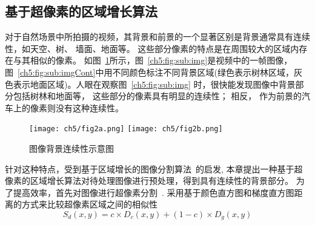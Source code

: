 \subsection{基于超像素的区域增长算法}
对于自然场景中所拍摄的视频，其背景和前景的一个显著区别是背景通常具有连续性，如天空、树、 墙面、地面等。 这些部分像素的特点是在周围较大的区域内存在与其相似的像素。
 如图~\ref{ch5:fig:cont}所示，图~\ref{ch5:fig:sub:img}是视频中的一帧图像， 图~\ref{ch5:fig:sub:imgCont}中用不同颜色标注不同背景区域(绿色表示树林区域，灰色表示地面区域)。人眼在观察图~\ref{ch5:fig:sub:img} 时，很快能发现图像中背景部分包括树林和地面等， 这些部分的像素具有明显的连续性； 相反， 作为前景的汽车上的像素则没有这种连续性。\par

 \begin{figure}[htb]
  \centering%
    {\texttt{[image: ch5/fig2a.png]}}%
 \hspace{1em}%
      {\texttt{[image: ch5/fig2b.png]}}

  \caption{图像背景连续性示意图}\label{ch5:fig:cont}
\end{figure}
 针对这种特点，受到基于区域增长的图像分割算法~\cite{seededRegionGrowing}的启发, 本章提出一种基于超像素的区域增长算法对待处理图像进行预处理，得到具有连续性的背景部分。 为了提高效率，首先对图像进行超像素分割~\cite{superpixel}. 采用基于颜色直方图和梯度直方图距离的方式来比较超像素区域之间的相似性
\begin{equation}\label{ch5:equ:distance}
S_d(x,y) = c \times D_c(x,y) + (1-c) \times D_g(x,y)
\end{equation}

